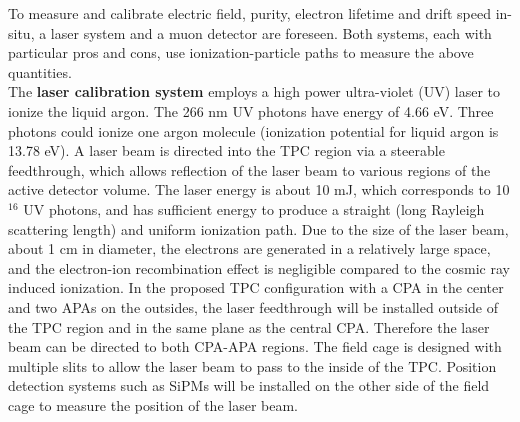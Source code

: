 To measure and calibrate electric field, purity, electron lifetime and drift speed in-situ, a laser system and a muon detector are foreseen. 
Both systems, each with particular pros and cons, use ionization-particle paths to measure the above quantities.\\
%
The {\bf laser calibration system} employs a high power ultra-violet (UV) laser to ionize the liquid argon. The 266 nm UV photons have energy of 4.66 eV. Three photons could ionize one argon molecule (ionization potential for liquid argon is 13.78 eV). 
A laser beam is directed into the TPC region via a steerable feedthrough, which allows reflection of the laser beam to various regions of the 
active detector volume. 
The laser energy is about 10 mJ, which corresponds to 10$^{16}$ UV photons, and has sufficient energy to produce 
a straight (long Rayleigh scattering length) and uniform ionization path. Due to the size of the laser beam, about 1 cm in diameter, 
the electrons are generated in a relatively large space, and the electron-ion recombination effect is negligible compared to the cosmic ray 
induced ionization. In the proposed TPC configuration with a CPA in the center and two APAs on the outsides, 
the laser feedthrough will be installed outside of the TPC region and in the same plane as the central CPA.
Therefore the laser beam can be directed to both CPA-APA regions. The field cage is designed with multiple slits to allow the laser 
beam to pass to the inside of the TPC. Position detection systems such as SiPMs will be installed on the other side of the field cage 
to measure the position of the laser beam.

